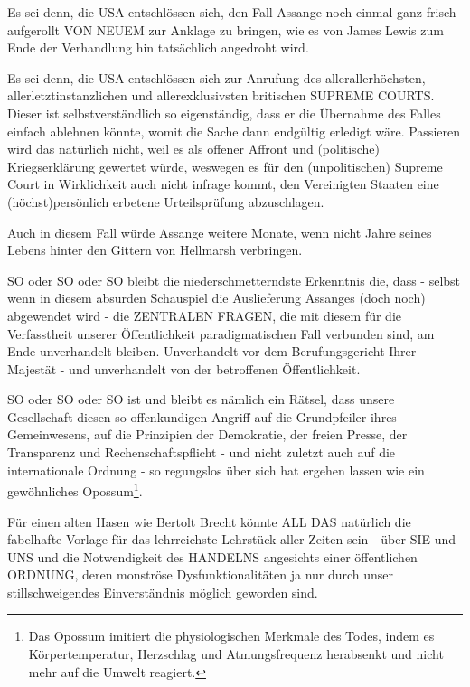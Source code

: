 \begin{multicols}{2}
Es sei denn, die USA entschlössen sich, den Fall Assange
noch einmal ganz frisch aufgerollt VON NEUEM zur Anklage zu bringen, wie es von James Lewis zum Ende der
Verhandlung hin tatsächlich angedroht wird.

Es sei denn, die USA entschlössen sich zur Anrufung
des allerallerhöchsten, allerletztinstanzlichen und allerexklusivsten britischen SUPREME COURTS. Dieser ist
selbstverständlich so eigenständig, dass er die Übernahme des Falles einfach ablehnen könnte, womit die
Sache dann endgültig erledigt wäre. Passieren wird das
natürlich nicht, weil es als offener Affront und (politische) Kriegserklärung gewertet würde, weswegen es
für den (unpolitischen) Supreme Court in Wirklichkeit
auch nicht infrage kommt, den Vereinigten Staaten eine
(höchst)persönlich erbetene Urteilsprüfung abzuschlagen.

Auch in diesem Fall würde Assange weitere Monate,
wenn nicht Jahre seines Lebens hinter den Gittern von
Hellmarsh verbringen.

SO oder SO oder SO bleibt die niederschmetterndste
Erkenntnis die, dass - selbst wenn in diesem absurden
Schauspiel die Auslieferung Assanges (doch noch) abgewendet wird - die ZENTRALEN FRAGEN, die mit diesem für die Verfasstheit unserer Öffentlichkeit paradigmatischen Fall verbunden sind, am Ende unverhandelt
bleiben. Unverhandelt vor dem Berufungsgericht Ihrer
Majestät - und unverhandelt von der betroffenen Öffentlichkeit.

SO oder SO oder SO ist und bleibt es nämlich ein Rätsel,
dass unsere Gesellschaft diesen so offenkundigen Angriff
auf die Grundpfeiler ihres Gemeinwesens, auf die Prinzipien der Demokratie, der freien Presse, der Transparenz
und Rechenschaftspflicht - und nicht zuletzt auch auf
die internationale Ordnung - so regungslos über sich hat
ergehen lassen wie ein gewöhnliches 
Opossum\footnote[24]{Das Opossum imitiert die physiologischen Merkmale des Todes, indem es Körpertemperatur, Herzschlag und Atmungsfrequenz herabsenkt und nicht mehr auf die Umwelt reagiert.}.

Für einen alten Hasen wie Bertolt Brecht könnte ALL
DAS natürlich die fabelhafte Vorlage für das lehrreichste
Lehrstück aller Zeiten sein - über SIE und UNS und die
Notwendigkeit des HANDELNS angesichts einer öffentlichen ORDNUNG, deren monströse Dysfunktionalitäten ja nur durch unser stillschweigendes Einverständnis
möglich geworden sind.




\end{multicols}
